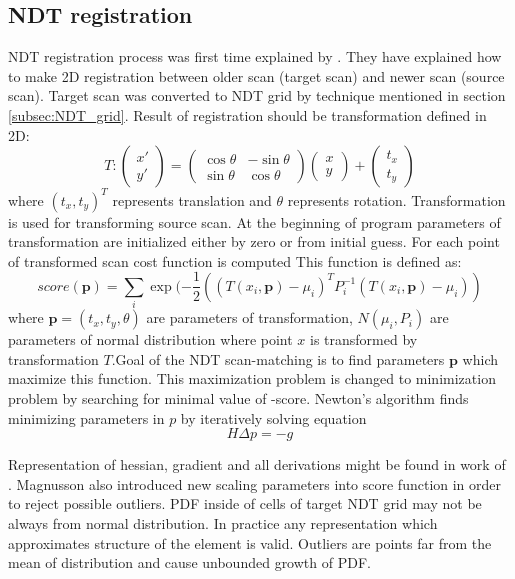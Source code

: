 \subsection{NDT registration}
\label{subsec:P2D_NDT}
NDT registration process was first time explained by \cite{Biber03}. They have explained how to make 2D registration between older scan (target scan) and newer scan (source scan). Target scan was converted to NDT grid by technique mentioned in section \ref{subsec:NDT_grid}. Result of registration should be transformation defined in 2D:
\begin{equation}
T: 
\begin{pmatrix}
x' \\ y'
\end{pmatrix}
=
\begin{pmatrix}
\cos \theta  & -\sin \theta\\
\sin \theta & \cos \theta
\end{pmatrix}
\begin{pmatrix}
x \\ y
\end{pmatrix}
+
\begin{pmatrix}
t_{x} \\ t_{y} 
\end{pmatrix}
\end{equation}
where $ (t_{x},t_{y})^{T}$ represents translation and $\theta$ represents rotation. Transformation is used for transforming source scan. At the beginning of program parameters of transformation are initialized either by zero or from initial guess. For each point of transformed scan cost function is computed This function is defined as:
\begin{equation}
score(\textbf{p}) = \sum_{i}^{} \exp(-\frac{1}{2} ((T(x_{i},\textbf{p})- \mu_{i})^{T} P^{-1}_{i}   (T(x_{i},\textbf{p})- \mu_{i}) ) 
\end{equation}
where $\textbf{p} = (t_{x},t_{y}, \theta)$ are parameters of transformation, $N(\mu_{i},P_{i})$ are parameters of normal distribution where point $x$ is transformed by transformation $T$.Goal of the NDT scan-matching is to find parameters $\textbf{p}$ which maximize this function. This maximization problem is changed to minimization problem by searching for minimal value of -score. Newton's algorithm finds minimizing parameters in $p$ by iteratively solving equation 
\begin{equation}
 H \varDelta p = -g
\end{equation}  

Representation of hessian, gradient and all derivations might be found in work of \cite{magnusson09}. Magnusson also introduced new scaling parameters into score function in order to reject possible outliers. \gls{PDF} inside of cells of target \gls{NDT} grid may not be always from normal distribution. In practice any representation which approximates structure of the element is valid. Outliers are points far from the mean of distribution and cause unbounded growth of \gls{PDF}.

